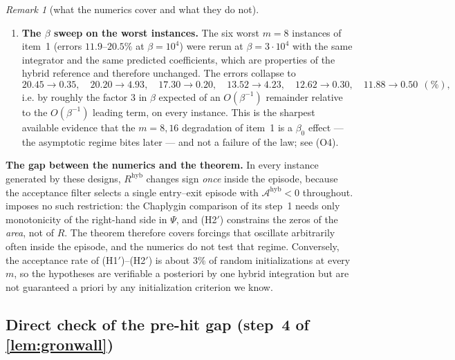 \documentclass[11pt]{article}
\theoremstyle{definition}
\theoremstyle{remark}
\newtheorem{remark}{Remark}
\newcommand{\hyb}{\mathrm{hyb}}
\newcommand{\Ar}{\mathcal{A}}
\begin{document}
\begin{remark}[what the numerics cover and what they do not]
\begin{enumerate}
item this is the empirical case for \cref{lem:gronwall} being the right estimate,
and it is why the exponential was worth removing.
\item \textbf{The $\beta$ sweep on the worst instances.} The six worst $m=8$
instances of item~1 (errors $11.9$--$20.5\%$ at $\beta=10^4$) were rerun at
$\beta=3\cdot10^4$ with the same integrator and the same predicted coefficients,
which are properties of the hybrid reference and therefore unchanged. The errors
collapse to
\[
20.45\to0.35,\quad 20.20\to4.93,\quad 17.30\to0.20,\quad
13.52\to4.23,\quad 12.62\to0.30,\quad 11.88\to0.50\ \ (\%),
\]
i.e. by roughly the factor $3$ in $\beta$ expected of an $O(\beta^{-1})$
remainder relative to the $O(\beta^{-1})$ leading term, on every instance.
This is the sharpest available evidence that the $m=8,16$ degradation of item~1
is a $\beta_0$ effect --- the asymptotic regime bites later --- and not a failure
of the law; see (O4).
\end{enumerate}
\textbf{The gap between the numerics and the theorem.} In every instance
generated by these designs, $R^{\hyb}$ changes sign \emph{once} inside the
episode, because the acceptance filter selects a single entry--exit episode with
$\Ar^{\hyb}<0$ throughout.  imposes no such restriction: the
Chaplygin comparison of its step~1 needs only monotonicity of the right-hand side
in $\Psi$, and (H2$'$) constrains the zeros of the \emph{area}, not of $R$. The
theorem therefore covers forcings that oscillate arbitrarily often inside the
episode, and the numerics do not test that regime. Conversely, the acceptance
rate of (H1$'$)--(H2$'$) is about $3\%$ of random initializations at every $m$,
so the hypotheses are verifiable a posteriori by one hybrid integration but are
not guaranteed a priori by any initialization criterion we know.
\end{remark}

\subsection*{Direct check of the pre-hit gap (step~4 of \cref{lem:gronwall})}
\end{document}
